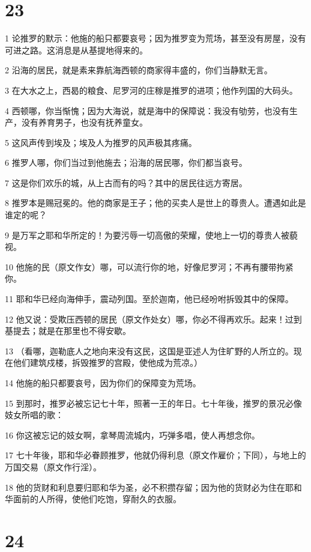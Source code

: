 \chapter{23}

\par 1 论推罗的默示：他施的船只都要哀号；因为推罗变为荒场，甚至没有房屋，没有可进之路。这消息是从基提地得来的。
\par 2 沿海的居民，就是素来靠航海西顿的商家得丰盛的，你们当静默无言。
\par 3 在大水之上，西曷的粮食、尼罗河的庄稼是推罗的进项；他作列国的大码头。
\par 4 西顿哪，你当惭愧；因为大海说，就是海中的保障说：我没有劬劳，也没有生产，没有养育男子，也没有抚养童女。
\par 5 这风声传到埃及；埃及人为推罗的风声极其疼痛。
\par 6 推罗人哪，你们当过到他施去；沿海的居民哪，你们都当哀号。
\par 7 这是你们欢乐的城，从上古而有的吗？其中的居民往远方寄居。
\par 8 推罗本是赐冠冕的。他的商家是王子；他的买卖人是世上的尊贵人。遭遇如此是谁定的呢？
\par 9 是万军之耶和华所定的！为要污辱一切高傲的荣耀，使地上一切的尊贵人被藐视。
\par 10 他施的民（原文作女）哪，可以流行你的地，好像尼罗河；不再有腰带拘紧你。
\par 11 耶和华已经向海伸手，震动列国。至於迦南，他已经吩咐拆毁其中的保障。
\par 12 他又说：受欺压西顿的居民（原文作处女）哪，你必不得再欢乐。起来！过到基提去；就是在那里也不得安歇。
\par 13 （看哪，迦勒底人之地向来没有这民，这国是亚述人为住旷野的人所立的。现在他们建筑戍楼，拆毁推罗的宫殿，使他成为荒凉。）
\par 14 他施的船只都要哀号，因为你们的保障变为荒场。
\par 15 到那时，推罗必被忘记七十年，照著一王的年日。七十年後，推罗的景况必像妓女所唱的歌：
\par 16 你这被忘记的妓女啊，拿琴周流城内，巧弹多唱，使人再想念你。
\par 17 七十年後，耶和华必眷顾推罗，他就仍得利息（原文作雇价；下同），与地上的万国交易（原文作行淫）。
\par 18 他的货财和利息要归耶和华为圣，必不积攒存留；因为他的货财必为住在耶和华面前的人所得，使他们吃饱，穿耐久的衣服。

\chapter{24}

